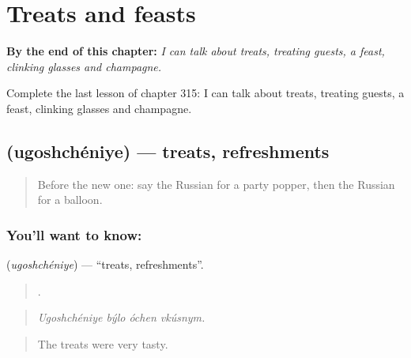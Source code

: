 
\chapter{Treats and feasts}
\label{ch:ru-treats-and-feasts}

\begin{chapteropening}
\textbf{By the end of this chapter:} \emph{I can talk about treats, treating guests, a feast, clinking glasses and champagne.}

Complete the last lesson of chapter 315: I can talk about treats, treating guests, a feast, clinking glasses and champagne.
\end{chapteropening}

\section[\texorpdfstring{\ru{угощение} (ugoshchéniye)}{угощение (ugoshchéniye)}]{ (ugoshchéniye) — treats, refreshments}

\label{lesson:RU-C315-ugoshcheniye}



\begin{quote}
Before the new one: say the Russian for a party popper, then the Russian for a balloon.
\end{quote}

\subsection*{You'll want to know: }
\textbf{} (\emph{ugoshchéniye}) — \textquotedblleft{}treats, refreshments\textquotedblright{}.

\begin{quote}
   .
\end{quote}

\begin{quote}
\emph{Ugoshchéniye býlo óchen vkúsnym.}
\end{quote}

\begin{quote}
The treats were very tasty.
\end{quote}

